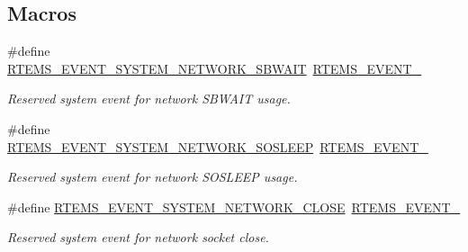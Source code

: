 \subsection*{Macros}
\begin{DoxyCompactItemize}
\item 
\mbox{\label{group__ClassicEventSystem_ga05457154d312c5a150daef5224c7e57d}} 
\#define \mbox{\hyperlink{group__ClassicEventSystem_ga05457154d312c5a150daef5224c7e57d}{R\+T\+E\+M\+S\+\_\+\+E\+V\+E\+N\+T\+\_\+\+S\+Y\+S\+T\+E\+M\+\_\+\+N\+E\+T\+W\+O\+R\+K\+\_\+\+S\+B\+W\+A\+IT}}~\mbox{\hyperlink{group__ClassicEventSet_ga7f3be4f18f7e5bddfe1dc2972c0996f7}{R\+T\+E\+M\+S\+\_\+\+E\+V\+E\+N\+T\+\_}}
\begin{DoxyCompactList}\small\item\em Reserved system event for network S\+B\+W\+A\+IT usage. \end{DoxyCompactList}\item 
\mbox{\label{group__ClassicEventSystem_ga558a24a8f123a0504581624ef64da2f5}} 
\#define \mbox{\hyperlink{group__ClassicEventSystem_ga558a24a8f123a0504581624ef64da2f5}{R\+T\+E\+M\+S\+\_\+\+E\+V\+E\+N\+T\+\_\+\+S\+Y\+S\+T\+E\+M\+\_\+\+N\+E\+T\+W\+O\+R\+K\+\_\+\+S\+O\+S\+L\+E\+EP}}~\mbox{\hyperlink{group__ClassicEventSet_gaf2db84bf8ad82344a8d3737fef086ab8}{R\+T\+E\+M\+S\+\_\+\+E\+V\+E\+N\+T\+\_}}
\begin{DoxyCompactList}\small\item\em Reserved system event for network S\+O\+S\+L\+E\+EP usage. \end{DoxyCompactList}\item 
\mbox{\label{group__ClassicEventSystem_ga1fea3fe58067f9eef5818bdaded0edc3}} 
\#define \mbox{\hyperlink{group__ClassicEventSystem_ga1fea3fe58067f9eef5818bdaded0edc3}{R\+T\+E\+M\+S\+\_\+\+E\+V\+E\+N\+T\+\_\+\+S\+Y\+S\+T\+E\+M\+\_\+\+N\+E\+T\+W\+O\+R\+K\+\_\+\+C\+L\+O\+SE}}~\mbox{\hyperlink{group__ClassicEventSet_gacdcc0364a5deed139edbf72b04523b7f}{R\+T\+E\+M\+S\+\_\+\+E\+V\+E\+N\+T\+\_}}
\begin{DoxyCompactList}\small\item\em Reserved system event for network socket close. \end{DoxyCompactList}\item 
\mbox{\label{group__ClassicEventSystem_gaea80c956d9d5356eb9ef093699fc2f5a}} 

\end{DoxyCompactItemize}
